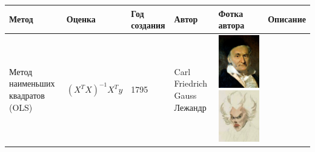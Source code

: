 \documentclass[10pt,a4paper]{article}
\begin{document}
\begin{table}
\begin{tabular} {|p{3cm}|p{4cm}|p{2cm}|p{2cm}|p{4cm}|p{10cm}|}
\hline
Метод & Оценка & Год создания & Автор & Фотка автора & Описание \\
\hline
Метод наименьших квадратов (OLS) & \begin{center}
 $(X^{T}X)^{-1}X^Ty$ \end{center} & 1795 & Carl Friedrich Gauss \newline Лежандр &  

\par \includegraphics[width=0.49\linewidth]{gauss.jpg}\includegraphics[width=0.49\linewidth]{lezhandr.jpg} 


\end{tabular}
\end{table}
\end{document}
